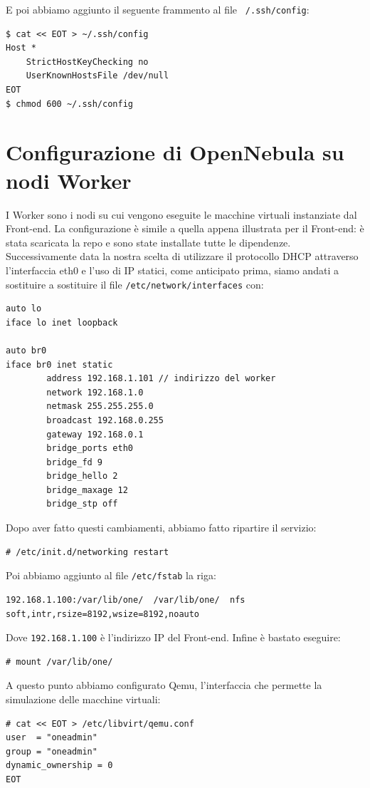 \documentclass[twoside]{article}
\begin{document}
E poi abbiamo aggiunto il seguente frammento al file \texttt{~/.ssh/config}:
\begin{lstlisting}[frame=trBL]
$ cat << EOT > ~/.ssh/config
Host *
    StrictHostKeyChecking no
    UserKnownHostsFile /dev/null
EOT
$ chmod 600 ~/.ssh/config
\end{lstlisting}

\section{Configurazione di OpenNebula su nodi Worker}
I Worker sono i nodi su cui vengono eseguite le macchine virtuali instanziate dal Front-end.
La configurazione è simile a quella appena illustrata per il Front-end: è stata scaricata la repo
e sono state installate tutte le dipendenze. Successivamente data la nostra scelta di utilizzare
il protocollo DHCP attraverso l'interfaccia eth0 e l'uso di IP statici, come anticipato prima,
siamo andati a sostituire a sostituire il file \texttt{/etc/network/interfaces} con:
\begin{lstlisting}[frame=trBL]
auto lo
iface lo inet loopback

auto br0
iface br0 inet static
        address 192.168.1.101 // indirizzo del worker
        network 192.168.1.0
        netmask 255.255.255.0
        broadcast 192.168.0.255
        gateway 192.168.0.1
        bridge_ports eth0
        bridge_fd 9
        bridge_hello 2
        bridge_maxage 12
        bridge_stp off
\end{lstlisting}

Dopo aver fatto questi cambiamenti, abbiamo fatto ripartire il servizio:
\begin{lstlisting}[frame=trBL]
# /etc/init.d/networking restart
\end{lstlisting}

Poi abbiamo aggiunto al file \texttt{/etc/fstab} la riga:
\begin{lstlisting}[frame=trBL]
192.168.1.100:/var/lib/one/  /var/lib/one/  nfs   soft,intr,rsize=8192,wsize=8192,noauto
\end{lstlisting}

Dove \texttt{192.168.1.100} è l'indirizzo IP del Front-end. Infine è bastato eseguire:
\begin{lstlisting}[frame=trBL]
# mount /var/lib/one/
\end{lstlisting}

A questo punto abbiamo configurato Qemu, l'interfaccia che permette la simulazione delle macchine virtuali:
\begin{lstlisting}[frame=trBL]
# cat << EOT > /etc/libvirt/qemu.conf
user  = "oneadmin"
group = "oneadmin"
dynamic_ownership = 0
EOT
\end{lstlisting}
\end{document}
